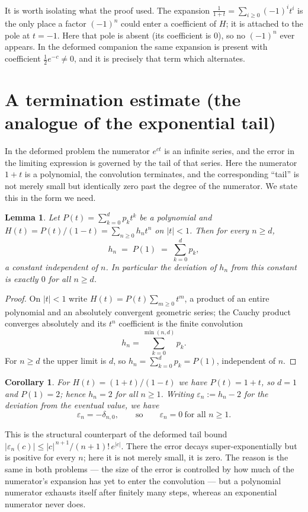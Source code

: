 \documentclass[11pt, fleqn]{amsart}
\newtheorem{lemma}[theorem]{Lemma}
\newtheorem{corollary}[theorem]{Corollary}
\theoremstyle{remark}
\begin{document}
\noindent
It is worth isolating what the proof used. The expansion $\frac{1}{1+t}=\sum_{i\ge0}(-1)^i t^i$
is the only place a factor $(-1)^n$ could enter a coefficient of $H$; it is attached to
the pole at $t=-1$. Here that pole is absent (its coefficient is $0$), so no $(-1)^n$
ever appears. In the deformed companion the same expansion is present with coefficient
$\tfrac12 e^{-c}\neq0$, and it is precisely that term which alternates.

\section{A termination estimate (the analogue of the exponential tail)}

In the deformed problem the numerator $e^{ct}$ is an infinite series, and the error in
the limiting expression is governed by the tail of that series. Here the numerator
$1+t$ is a polynomial, the convolution terminates, and the corresponding ``tail'' is not
merely small but identically zero past the degree of the numerator. We state this in the
form we need.

\begin{lemma}\label{lem:terminate}
Let $P(t)=\sum_{k=0}^{d}p_k t^k$ be a polynomial and $H(t)=P(t)/(1-t)=\sum_{n\ge0}h_n t^n$
on $|t|<1$. Then for every $n\ge d$,
\[
h_n\;=\;P(1)\;=\;\sum_{k=0}^{d}p_k ,
\]
a constant independent of $n$. In particular the deviation of $h_n$ from this constant
is exactly $0$ for all $n\ge d$.
\end{lemma}

\begin{proof}
On $|t|<1$ write $H(t)=P(t)\sum_{m\ge0}t^m$, a product of an entire polynomial and an
absolutely convergent geometric series; the Cauchy product converges absolutely and its
$t^n$ coefficient is the finite convolution
\[
h_n=\sum_{k=0}^{\min(n,d)}p_k .
\]
For $n\ge d$ the upper limit is $d$, so $h_n=\sum_{k=0}^{d}p_k=P(1)$, independent of $n$.
\end{proof}

\begin{corollary}\label{cor:terminate2}
For $H(t)=(1+t)/(1-t)$ we have $P(t)=1+t$, so $d=1$ and $P(1)=2$; hence $h_n=2$ for all
$n\ge1$. Writing $\varepsilon_n:=h_n-2$ for the deviation from the eventual value, we
have
\[
\varepsilon_n=-\delta_{n,0},\qquad\text{so}\qquad \varepsilon_n=0\ \text{for all } n\ge1 .
\]
\end{corollary}

\noindent
This is the structural counterpart of the deformed tail bound
$|\varepsilon_n(c)|\le |c|^{\,n+1}/(n+1)!\,e^{|c|}$. There the error decays
super-exponentially but is positive for every $n$; here it is not merely small, it is
zero. The reason is the same in both problems --- the size of the error is controlled by
how much of the numerator's expansion has yet to enter the convolution --- but a
polynomial numerator exhausts itself after finitely many steps, whereas an exponential
numerator never does.
\end{document}
